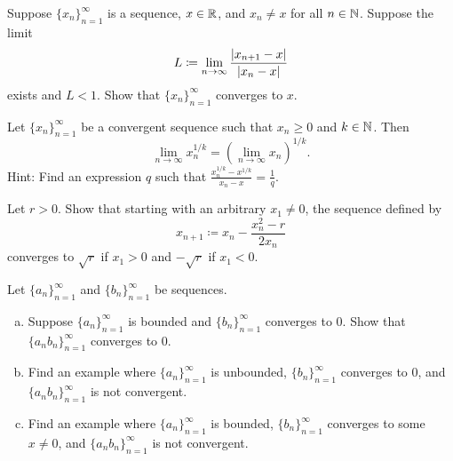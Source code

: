 \begin{exercise}
Suppose $\{ x_n \}_{n=1}^\infty$ is a sequence, $x \in {\mathbb{R}}$, and $x_n \not= x$ for
all $n \in {\mathbb{N}}$.  Suppose the limit
\begin{equation*}
L \coloneqq \lim_{n \to \infty} \frac{\left\lvert {x_{n+1}-x} \right\rvert}{\left\lvert {x_n-x} \right\rvert}
\end{equation*}
exists and $L < 1$.  Show that $\{ x_n \}_{n=1}^\infty$ converges to $x$.
\end{exercise}

\begin{exercise}[Challenging]
Let $\{ x_n \}_{n=1}^\infty$ be a convergent sequence such
that $x_n \geq 0$ and $k \in {\mathbb{N}}$.
Then
\begin{equation*}
\lim_{n\to\infty} x_n^{1/k} =
{\left( \lim_{n\to\infty} x_n \right)}^{1/k} .
\end{equation*}
Hint: Find an expression $q$ such that $\frac{x_n^{1/k}-x^{1/k}}{x_n-x} =
\frac{1}{q}$.
\end{exercise}

\begin{exercise}
Let $r > 0$.  Show that starting with an arbitrary $x_1 \not= 0$, the sequence
defined by
\begin{equation*}
x_{n+1} \coloneqq x_n - \frac{x_n^2-r}{2x_n}
\end{equation*}
converges to $\sqrt{r}$ if $x_1 > 0$ and $-\sqrt{r}$ if $x_1 < 0$.
\end{exercise}

\begin{samepage}
\begin{exercise}
Let $\{ a_n \}_{n=1}^\infty$ and $\{ b_n \}_{n=1}^\infty$ be sequences.
\begin{enumerate}[a)]
\item
Suppose $\{ a_n \}_{n=1}^\infty$ is bounded and $\{ b_n \}_{n=1}^\infty$ converges to 0.
Show that $\{ a_n b_n \}_{n=1}^\infty$ converges to 0.
\item
Find an example where $\{ a_n \}_{n=1}^\infty$ is unbounded, $\{ b_n \}_{n=1}^\infty$ converges to
0, and $\{ a_n b_n \}_{n=1}^\infty$ is not convergent.
\item
Find an example where $\{ a_n \}_{n=1}^\infty$ is bounded, $\{ b_n \}_{n=1}^\infty$ converges to
some $x \not= 0$, and $\{ a_n b_n \}_{n=1}^\infty$ is not convergent.
\end{enumerate}
\end{exercise}
\end{samepage}

